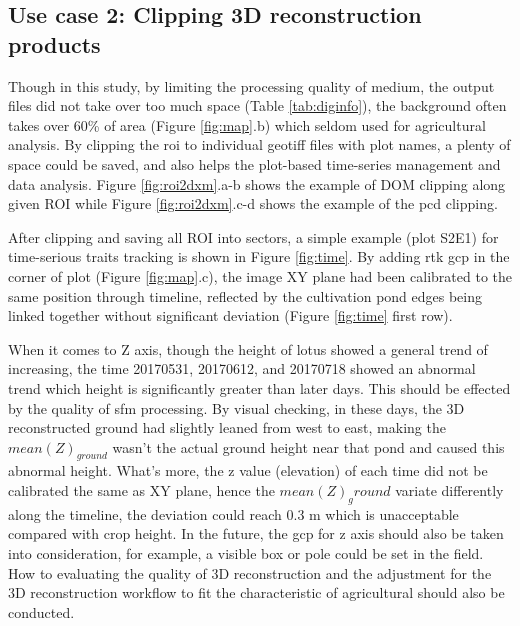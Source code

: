 \documentclass{configs/bmcart}
\begin{document}
\subsection*{Use case 2: Clipping 3D reconstruction products}
Though in this study, by limiting the processing quality of medium, the output files did not take over too much space (Table \ref{tab:diginfo}), the background often takes over 60\% of area (Figure \ref{fig:map}.b) which seldom used for agricultural analysis. By clipping the \acrfull*{roi} to individual geotiff files with plot names, a plenty of space could be saved, and also helps the plot-based time-series management and data analysis. Figure \ref{fig:roi2dxm}.a-b shows the example of DOM clipping along given ROI while Figure \ref{fig:roi2dxm}.c-d shows the example of the \acrfull*{pcd} clipping.

After clipping and saving all ROI into sectors, a simple example (plot S2E1) for time-serious traits tracking is shown in Figure \ref{fig:time}. By adding \acrfull*{rtk} \acrfull*{gcp} in the corner of plot (Figure \ref{fig:map}.c), the image XY plane had been calibrated to the same position through timeline, reflected by the cultivation pond edges being linked together without significant deviation (Figure \ref{fig:time} first row). 

When it comes to Z axis, though the height of lotus showed a general trend of increasing, the time 20170531, 20170612, and 20170718 showed an abnormal trend which height is significantly greater than later days. This should be effected by the quality of \acrfull*{sfm} processing. By visual checking, in these days, the 3D reconstructed ground had slightly leaned from west to east, making the $mean(Z)_{ground}$ wasn't the actual ground height near that pond and caused this abnormal height. What's more, the z value (elevation) of each time did not be calibrated the same as XY plane, hence the $mean(Z)_ground$ variate differently along the timeline, the deviation could reach 0.3 m which is unacceptable compared with crop height. In the future, the \acrshort*{gcp} for z axis should also be taken into consideration, for example, a visible box or pole could be set in the field. How to evaluating the quality of 3D reconstruction and the adjustment for the 3D reconstruction workflow to fit the characteristic of agricultural should also be conducted.
\end{document}
